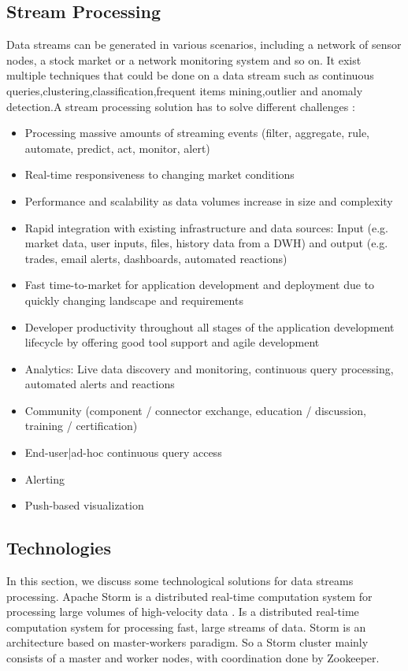 \documentclass[twoside,12pt, a4paper]{report}
\begin{document}
\subsection{Stream Processing}
\cite{namiot2015big}
Data streams can be generated in various scenarios,
including a network of sensor nodes, a stock market or a
network monitoring system and so on. It exist multiple techniques that could be done on 
a data stream such as continuous queries,clustering,classification,frequent items mining,outlier and anomaly detection.A stream processing solution has to solve different
challenges \cite{Wähner_2014} :
\begin{itemize}
\item  Processing massive amounts of streaming events (filter, aggregate, rule, automate, predict, act, monitor, alert)
\item  Real-time responsiveness to changing market conditions
\item  Performance and scalability as data volumes increase in size and complexity
\item  Rapid integration with existing infrastructure and data sources: Input (e.g. market data, user inputs, files, history data from a DWH) and output (e.g. trades, email alerts, dashboards, automated reactions)
\item  Fast time-to-market for application development and deployment due to quickly changing landscape and requirements
\item  Developer productivity throughout all stages of the application development lifecycle by offering good tool support and agile development
\item  Analytics: Live data discovery and monitoring, continuous query processing, automated alerts and reactions
\item  Community (component / connector exchange, education / discussion, training / certification)
\item  End-user|ad-hoc continuous query access
\item  Alerting
\item  Push-based visualization
\end{itemize}

\subsection{Technologies}
\cite{namiot2015big}
In this section, we discuss some technological solutions for
data streams processing.
Apache Storm is a distributed real-time computation system
for processing large volumes of high-velocity data \cite{jain2014learning}. Is a
distributed real-time computation system for processing fast,
large streams of data. Storm is an architecture based on
master-workers paradigm. So a Storm cluster mainly
consists of a master and worker nodes, with coordination
done by Zookeeper.
\end{document}
